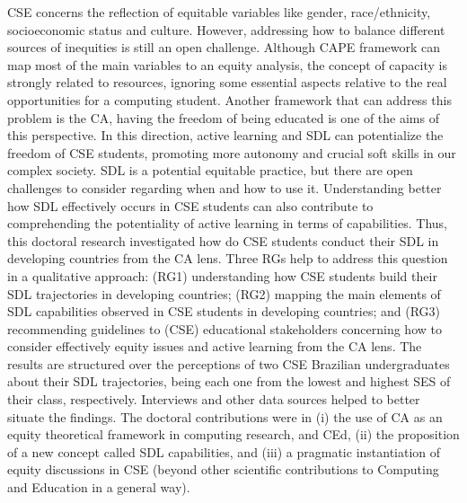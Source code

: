 


    



\begin{resumo}[Abstract]

\gls{CSE} concerns the reflection of equitable variables like gender, race/ethnicity, socioeconomic status  and culture. However, addressing how to balance different sources of inequities is still an open challenge. Although \gls{CAPE} framework can map most of the main variables to an equity analysis, the concept of capacity is strongly related to resources, ignoring some essential aspects relative to the real opportunities for a computing student. Another framework that can address this problem is the \gls{CA}, having the freedom of being educated is one of the aims of this perspective. In this direction, active learning and \gls{SDL} can potentialize the freedom of \gls{CSE} students, promoting more autonomy and crucial soft skills in our complex society. \gls{SDL} is a potential equitable practice, but there are open challenges to consider regarding when and how to use it. Understanding better how \gls{SDL} effectively occurs in \gls{CSE} students can also contribute to comprehending the potentiality of active learning in terms of capabilities. Thus, this doctoral research investigated how do \gls{CSE} students conduct their \gls{SDL} in developing countries from the \gls{CA} lens. Three \glspl{RG} help to address this question in a qualitative approach: (\gls{RG}1) understanding how \gls{CSE} students build their \gls{SDL} trajectories in developing countries; (\gls{RG}2) mapping the main elements of \gls{SDL} capabilities observed in \gls{CSE} students in developing countries; and (\gls{RG}3) recommending guidelines to (\gls{CSE}) educational stakeholders concerning how to consider effectively equity issues and active learning from the \gls{CA} lens.  The results are structured over the perceptions of two \gls{CSE} Brazilian undergraduates about their \gls{SDL} trajectories, being each one from the lowest and highest \gls{SES} of their class, respectively. Interviews and other data sources helped to better situate the findings. The doctoral contributions were in (i) the use of \gls{CA} as an equity theoretical framework in computing research, and \gls{CEd}, (ii) the proposition of a new concept called \gls{SDL} capabilities, and (iii) a pragmatic instantiation of equity discussions in \gls{CSE} (beyond other scientific contributions to Computing and Education in a general way).


\end{resumo}
